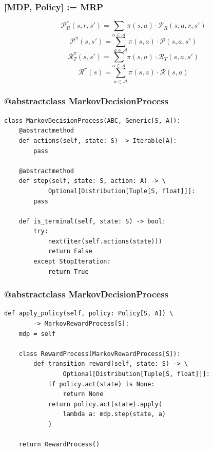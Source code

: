 \documentclass[handout]{beamer}
\begin{document}
\begin{frame}
\frametitle{[MDP, Policy] := MRP}
\pause
$$\mathcal{P}_R^{\pi}(s,r,s') = \sum_{a\in \mathcal{A}} \pi(s,a) \cdot \mathcal{P}_R(s,a,r,s')$$ 
\pause
$$\mathcal{P}^{\pi}(s,s') = \sum_{a\in \mathcal{A}} \pi(s,a) \cdot \mathcal{P}(s,a,s')$$
\pause
$$\mathcal{R}_T^{\pi}(s,s') = \sum_{a\in \mathcal{A}} \pi(s,a) \cdot \mathcal{R}_T(s,a,s')$$
\pause
$$\mathcal{R}^{\pi}(s) = \sum_{a\in \mathcal{A}} \pi(s,a) \cdot \mathcal{R}(s,a)$$
\end{frame}


\begin{frame}[fragile]
\frametitle{@abstractclass MarkovDecisionProcess}
\pause
\begin{lstlisting}
class MarkovDecisionProcess(ABC, Generic[S, A]):
    @abstractmethod
    def actions(self, state: S) -> Iterable[A]:
        pass

    @abstractmethod
    def step(self, state: S, action: A) -> \
            Optional[Distribution[Tuple[S, float]]]:
        pass
        
    def is_terminal(self, state: S) -> bool:
        try:
            next(iter(self.actions(state)))
            return False
        except StopIteration:
            return True
\end{lstlisting}
\end{frame}


\begin{frame}[fragile]
\frametitle{@abstractclass MarkovDecisionProcess}
\pause
\begin{lstlisting}
def apply_policy(self, policy: Policy[S, A]) \
        -> MarkovRewardProcess[S]:
    mdp = self

    class RewardProcess(MarkovRewardProcess[S]):
        def transition_reward(self, state: S) -> \
                Optional[Distribution[Tuple[S, float]]]:
            if policy.act(state) is None:
                return None
            return policy.act(state).apply(
                lambda a: mdp.step(state, a)
            )

    return RewardProcess()        
\end{lstlisting}
\end{frame}
\end{document}
